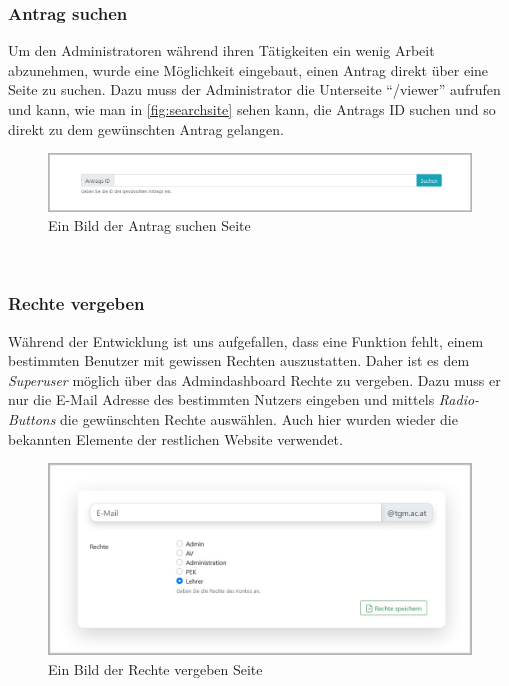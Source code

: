 \subsubsection{Antrag suchen}
\label{chapter:implementierung-frontend-komponenten-suchen}
Um den Administratoren während ihren Tätigkeiten ein wenig Arbeit abzunehmen, wurde eine Möglichkeit eingebaut, einen Antrag direkt über eine Seite zu suchen. Dazu muss der Administrator die Unterseite \enquote{/viewer} aufrufen und kann, wie man in \autoref{fig:searchsite} sehen kann, die Antrags ID suchen und so direkt zu dem gewünschten Antrag gelangen.
\begin{figure}[H]
	\centering
	\includegraphics[width=1\linewidth]{images/ldehner_implementierung/search}
	\caption[Antrag suchen Seite]{Ein Bild der Antrag suchen Seite}
	\label{fig:searchsite}
\end{figure}
~\\

\newpage 
\subsubsection{Rechte vergeben}
\label{chapter:implementierung-frontend-komponenten-rechte}
Während der Entwicklung ist uns aufgefallen, dass eine Funktion fehlt, einem bestimmten Benutzer mit gewissen Rechten auszustatten. Daher ist es dem \textit{Superuser} möglich über das Admindashboard Rechte zu vergeben. Dazu muss er nur die E-Mail Adresse des bestimmten Nutzers eingeben und mittels \textit{Radio-Buttons} die gewünschten Rechte auswählen. Auch hier wurden wieder die bekannten Elemente der restlichen Website verwendet.
\begin{figure}[H]
	\centering
	\includegraphics[width=1\linewidth]{images/ldehner_implementierung/rechte}
	\caption[Rechte vergeben Seite]{Ein Bild der Rechte vergeben Seite}
	\label{fig:rightssite}
\end{figure}